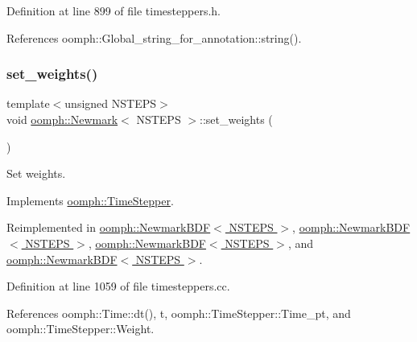 Definition at line 899 of file timesteppers.\+h.



References oomph\+::\+Global\+\_\+string\+\_\+for\+\_\+annotation\+::string().

\mbox{\label{classoomph_1_1Newmark_ad175de47f064359fa319a11088b759aa}} 
\subsubsection{\texorpdfstring{set\+\_\+weights()}{set\_weights()}}
{\footnotesize\ttfamily template$<$unsigned N\+S\+T\+E\+PS$>$ \\
void \hyperlink{classoomph_1_1Newmark}{oomph\+::\+Newmark}$<$ N\+S\+T\+E\+PS $>$\+::set\+\_\+weights (\begin{DoxyParamCaption}{ }\end{DoxyParamCaption})\hspace{0.3cm}{\ttfamily [virtual]}}



Set weights. 



Implements \hyperlink{classoomph_1_1TimeStepper_a028fa3a8d3c6db6b0ddf580cb0468d55}{oomph\+::\+Time\+Stepper}.



Reimplemented in \hyperlink{classoomph_1_1NewmarkBDF_a1fe8947081bc206ccf050fa643010036}{oomph\+::\+Newmark\+B\+D\+F$<$ N\+S\+T\+E\+P\+S $>$}, \hyperlink{classoomph_1_1NewmarkBDF_af474fb6329584b3055d757a743919fda}{oomph\+::\+Newmark\+B\+D\+F$<$ N\+S\+T\+E\+P\+S $>$}, \hyperlink{classoomph_1_1NewmarkBDF_a4ac70586d355c8f45ec8dd4f94c3316a}{oomph\+::\+Newmark\+B\+D\+F$<$ N\+S\+T\+E\+P\+S $>$}, and \hyperlink{classoomph_1_1NewmarkBDF_a338055c11a633d2d22e5fd3b378910b2}{oomph\+::\+Newmark\+B\+D\+F$<$ N\+S\+T\+E\+P\+S $>$}.



Definition at line 1059 of file timesteppers.\+cc.



References oomph\+::\+Time\+::dt(), t, oomph\+::\+Time\+Stepper\+::\+Time\+\_\+pt, and oomph\+::\+Time\+Stepper\+::\+Weight.

\mbox{\label{classoomph_1_1Newmark_af56a2965f66e9a181b336e11cc613b21}} 
